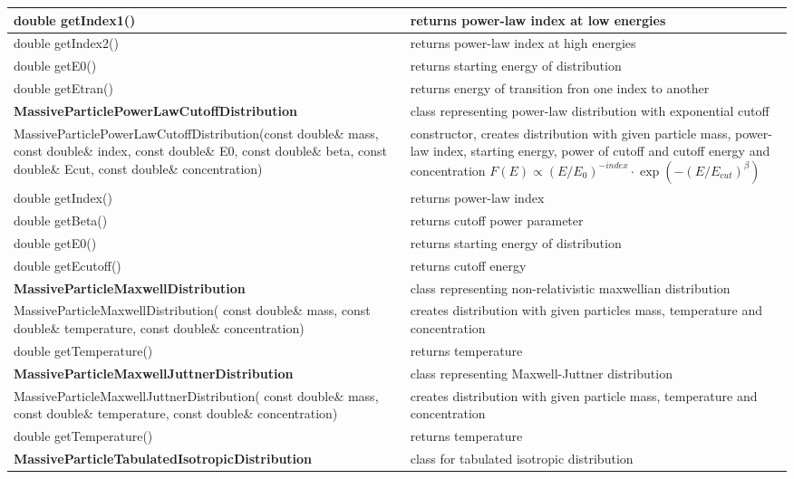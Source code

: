 \begin{small}
\begin{xtabular}{|p{0.57\textwidth}|p{0.43\textwidth}|}
		\hline
		double getIndex1() & returns power-law index at low energies\\
		\hline
		double getIndex2() & returns power-law index at high energies\\
		\hline
		double getE0() & returns starting energy of distribution\\
		\hline
		double getEtran() & returns energy of transition fron one index to another\\
		\hline
		\textbf{MassiveParticlePowerLawCutoffDistribution} & class representing power-law distribution with exponential cutoff\\
		\hline
		MassiveParticlePowerLawCutoffDistribution(const double\& mass, const double\& index, const double\& E0, const double\& beta, const double\& Ecut, const double\& concentration) & constructor, creates distribution with given particle mass, power-law index, starting energy, power of cutoff and cutoff energy and concentration $F(E)\propto (E/E_0)^{-index}\cdot\exp(-(E/E_{cut})^\beta)$\\
		\hline
		double getIndex() & returns power-law index \\
		\hline
		double getBeta() & returns cutoff power parameter \\
		\hline
		double getE0() & returns starting energy of distribution\\
		\hline
		double getEcutoff() & returns cutoff energy\\
		\hline
		\textbf{MassiveParticleMaxwellDistribution} & class representing non-relativistic maxwellian distribution\\
		\hline
		MassiveParticleMaxwellDistribution( const double\& mass, const double\& temperature, const double\& concentration) & creates distribution with given particles mass, temperature and concentration\\
		\hline
		double getTemperature() & returns temperature\\
		\hline
		\textbf{MassiveParticleMaxwellJuttnerDistribution} & class representing Maxwell-Juttner distribution\\
		\hline
		MassiveParticleMaxwellJuttnerDistribution( const double\& mass, const double\& temperature, const double\& concentration) & creates distribution with given particle mass, temperature and concentration\\
		\hline
		double getTemperature() & returns temperature\\
		\hline
		\textbf{MassiveParticleTabulatedIsotropicDistribution} & class for tabulated isotropic distribution\\

\end{xtabular}
\end{small}
